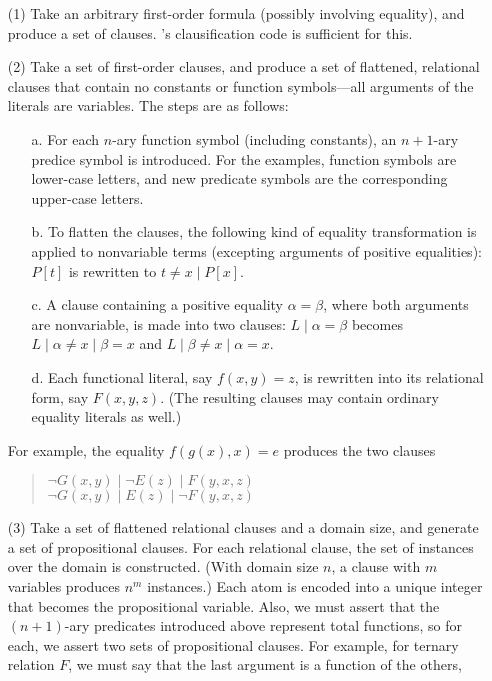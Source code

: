 \begin{enumerate}
\item[(1)]
Take an arbitrary first-order formula (possibly involving equality),
and produce a set of clauses.  \otter 's clausification code is
sufficient for this.
\item[(2)]
Take a set of first-order clauses, and produce a set of flattened,
relational clauses that
contain no constants or function symbols---all arguments of
the literals are variables.  The steps are as follows:
\begin{enumerate}
\item[a.]
For each $n$-ary function symbol
(including constants), an $n+1$-ary predice symbol is introduced.
For the examples, function symbols are lower-case letters, and new predicate
symbols are the corresponding upper-case letters.
\item[b.]
To flatten the clauses, the following kind of equality
transformation is applied to nonvariable terms (excepting arguments
of positive equalities): $P[t]$ is rewritten to $t\neq x \; |\; P[x]$.
\item[c.]
A clause containing a positive equality $\alpha=\beta$, where both arguments
are nonvariable,
is made into two clauses: $L\;|\;\alpha=\beta$ becomes
$L\;|\;\alpha\neq x\;|\;\beta=x$ and $L\;|\;\beta\neq x\;|\;\alpha=x$.
\item[d.]
Each functional literal, say $f(x,y)=z$, is rewritten into its
relational form, say $F(x,y,z)$.  (The resulting clauses may contain
ordinary equality literals as well.)
\end{enumerate}
For example, the equality $f(g(x),x)=e$ produces the two clauses
\begin{verse}
$\neg G(x,y) \;|\;\neg E(z) \;|\;F(y,x,z)$ \\
$\neg G(x,y) \;|\;E(z) \;|\;\neg F(y,x,z)$
\end{verse}
\item[(3)]
Take a set of flattened relational clauses and a domain size, and
generate a set of propositional clauses.  For each relational clause,
the set of instances over the domain is constructed.  (With domain
size $n$, a clause with $m$ variables produces $n^m$ instances.)  Each
atom is encoded into a unique integer that becomes the propositional
variable.  Also, we must assert that the $(n+1)$-ary predicates
introduced above represent total functions, so for each, we assert two
sets of propositional clauses.  For example, for ternary relation $F$,
we must say that the last argument is a function of the others,

\end{enumerate}
